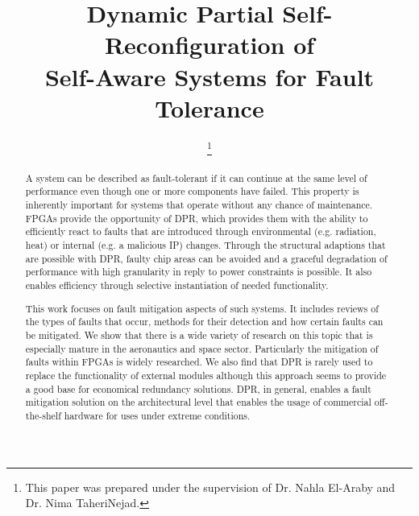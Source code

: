 \documentclass[conference]{IEEEtran}
\title{Dynamic Partial Self-Reconfiguration of \\Self-Aware Systems for Fault Tolerance}
\author{\IEEEauthorblockN{Constantin Schieber}
\IEEEauthorblockA{%
Institute of Computer Technology\\
TU Wien, Vienna, Austria\\
constantin.schieber@tuwien.ac.at}
\thanks{This paper was prepared under the supervision of Dr. Nahla El-Araby and Dr. Nima TaheriNejad.}
}
\begin{document}
\maketitle

\begin{abstract}
    A system can be described as fault-tolerant if it can continue at the same level of performance even though one or more components have failed. 
    This property is inherently important for systems that operate without any chance of maintenance.
    \glspl{FPGA} provide the opportunity of \gls{DPR}, which provides them with the ability to efficiently react to faults that are introduced through environmental (e.g. radiation, heat) or internal (e.g. a malicious \gls{IP}) changes.
    Through the structural adaptions that are possible with \gls{DPR}, faulty chip areas can be avoided and a graceful degradation of performance with high granularity in reply to power constraints is possible.
    It also enables efficiency through selective instantiation of needed functionality.
    
    This work focuses on fault mitigation aspects of such systems. 
    It includes reviews of the types of faults that occur, methods for their detection and how certain faults can be mitigated. 
    We show that there is a wide variety of research on this topic that is especially mature in the aeronautics and space sector.
    Particularly the mitigation of faults within \glspl{FPGA} is widely researched.
    We also find that \gls{DPR} is rarely used to replace the functionality of external modules although this approach seems to provide a good base for economical redundancy solutions.
    \gls{DPR}, in general, enables a fault mitigation solution on the architectural level that enables the usage of commercial off-the-shelf hardware for uses under extreme conditions.
    
    

\end{abstract}
\end{document}
